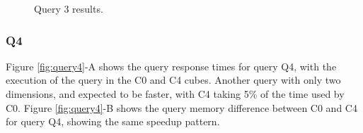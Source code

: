 \begin{figure}[H]
  \caption{Query 3 results.}\label{fig:query3}
  \vspace{6mm}
  \begin{center}
  \end{center}
  \vspace{2mm}
\end{figure}

\hypertarget{q4-1}{%
\subsubsection{Q4}\label{q4-1}}

Figure \ref{fig:query4}-A shows the query response times for query Q4, with the execution of the query in the C0 and C4 cubes.
Another query with only two dimensions, and expected to be faster, with C4 taking 5\% of the time used by C0.
Figure \ref{fig:query4}-B shows the query memory difference between C0 and C4 for query Q4, showing the same speedup pattern.


